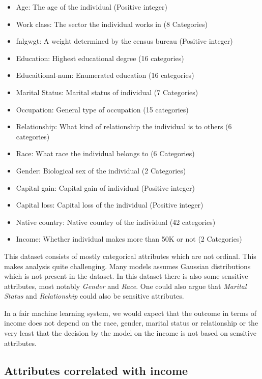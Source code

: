 \begin{itemize}
    \item Age: The age of the individual (Positive integer)
    \item Work class: The sector the individual works in (8 Categories)
    \item fnlgwgt: A weight determined by the census bureau (Positive integer)
    \item Education: Highest educational degree (16 categories)
    \item Educaitional-num: Enumerated education (16 categories)
    \item Marital Status: Marital status of individual (7 Categories)
    \item Occupation: General type of occupation (15 categories)
    \item Relationship: What kind of relationship the individual is to others (6 categories)
    \item Race: What race the individual belongs to (6 Categories)
    \item Gender: Biological sex of the individual (2 Categories)
    \item Capital gain: Capital gain of individual (Positive integer)
    \item Capital loss: Capital loss of the individual (Positive integer)
    \item Native country: Native country of the individual (42 categories)
    \item Income: Whether individual makes more than 50K or not (2 Categories)
\end{itemize}

This dataset consists of mostly categorical attributes which are not ordinal. This makes analysis quite challenging. Many models assumes Gaussian distributions which is not present in the dataset. In this dataset there is also some sensitive attributes, most notably \emph{Gender} and \emph{Race}. One could also argue that \emph{Marital Status} and \emph{Relationship} could also be sensitive attributes.

In a fair machine learning system, we would expect that the outcome in terms of income does not depend on the race, gender, marital status or relationship or the very least that the decision by the model on the income is not based on sensitive attributes.

\subsection{Attributes correlated with income}


